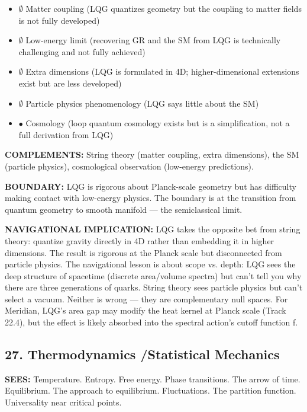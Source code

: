 \begin{itemize}[nosep,leftmargin=*]
  \item $\emptyset$ Matter coupling (LQG quantizes geometry but the coupling to matter fields is not fully developed)
  \item $\emptyset$ Low-energy limit (recovering GR and the SM from LQG is technically challenging and not fully achieved)
  \item $\emptyset$ Extra dimensions (LQG is formulated in 4D; higher-dimensional extensions exist but are less developed)
  \item $\emptyset$ Particle physics phenomenology (LQG says little about the SM)
  \item $\bullet$ Cosmology (loop quantum cosmology exists but is a simplification, not a full derivation from LQG)
\end{itemize}


\textbf{COMPLEMENTS:} String theory (matter coupling, extra dimensions), the SM (particle physics), cosmological observation (low-energy predictions).


\textbf{BOUNDARY:} LQG is rigorous about Planck-scale geometry but has difficulty making contact with low-energy physics. The boundary is at the transition from quantum geometry to smooth manifold — the semiclassical limit.


\textbf{NAVIGATIONAL IMPLICATION:} LQG takes the opposite bet from string theory: quantize gravity directly in 4D rather than embedding it in higher dimensions. The result is rigorous at the Planck scale but disconnected from particle physics. The navigational lesson is about scope vs. depth: LQG sees the deep structure of spacetime (discrete area/\allowbreak volume spectra) but can't tell you why there are three generations of quarks. String theory sees particle physics but can't select a vacuum. Neither is wrong — they are complementary null spaces. For Meridian, LQG's area gap may modify the heat kernel at Planck scale (Track 22.4), but the effect is likely absorbed into the spectral action's cutoff function f.


\bigskip\noindent\makebox[\textwidth]{\color{rulegray}\rule{5cm}{0.3pt}}\bigskip


\subsection*{27. Thermodynamics /\allowbreak  Statistical Mechanics}


\textbf{SEES:} Temperature. Entropy. Free energy. Phase transitions. The arrow of time. Equilibrium. The approach to equilibrium. Fluctuations. The partition function. Universality near critical points.


